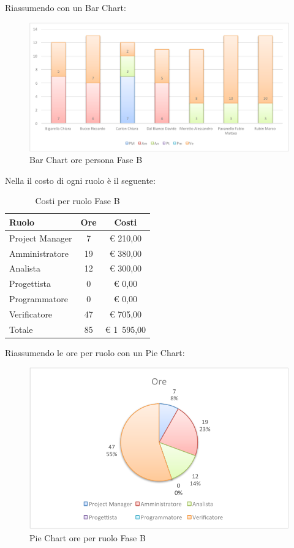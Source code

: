 				Riassumendo con un Bar Chart:
				\begin{figure}[H]\centering
					\includegraphics[width=\textwidth]{PianoDiProgetto/Pics/ChartOreFaseB.pdf}
					\caption{Bar Chart ore persona Fase B}
				\end{figure}
				Nella  il costo di ogni ruolo è il seguente:
				\begin{table}[H]
					\begin{center}
						\begin{tabular}{| l | c | c |}
							\hline
							Ruolo 			& Ore 	& Costi  \\ \hline
							
							Project Manager	& 7 		& \euro{} 210,00 	\\
							Amministratore 		& 19 		& \euro{} 380,00 	\\
							Analista	 		& 12 		& \euro{} 300,00 	\\
							Progettista 		& 0		& \euro{} 0,00 	\\
							Programmatore		& 0		& \euro{} 0,00	\\
							Verificatore		& 47 		& \euro{} 705,00 	\\ \hline \hline
							
							Totale	 		& 85 		& \euro{} 1~595,00 	\\ \hline
						\end{tabular}
					\end{center}
					\caption{Costi per ruolo Fase B}
				\end{table}
				Riassumendo le ore per ruolo con un Pie Chart:
				\begin{figure}[H]\centering
					\includegraphics[width=\textwidth]{PianoDiProgetto/Pics/ChartTotOreFaseB.pdf}
					\caption{Pie Chart ore per ruolo Fase B}
				\end{figure}
